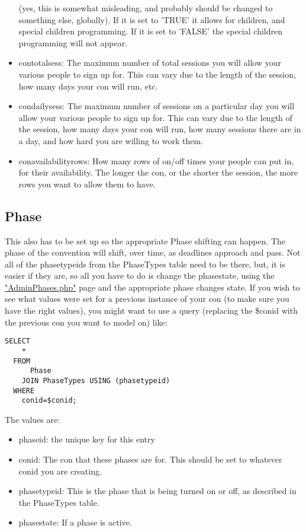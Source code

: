 \documentclass[captions=tablesignature]{scrartcl}
\begin{document}
\begin{itemize}
(yes, this is somewhat misleading, and probably should be changed
to something else, globally).  If it is set to 'TRUE' it allows
for children, and special children programming.  If it is set to
'FALSE' the special children programming will not appear.
\item contotalsess: The maximum number of total sessions you will allow
your various people to sign up for.  This can vary due to the
length of the session, how many days your con will run, etc.
\item condailysess: The maximum number of sessions on a particular day
you will allow your various people to sign up for.  This can vary
due to the length of the session, how many days your con will
run, how many sessions there are in a day, and how hard you are
willing to work them.
\item conavailabilityrows: How many rows of on/off times your people
can put in, for their availability.  The longer the con, or the
shorter the session, the more rows you want to allow them to
have.
\end{itemize}

\subsection{Phase}
\label{sec-11-2}

This also has to be set up so the appropriate Phase shifting can
happen.  The phase of the convention will shift, over time, as
deadlines approach and pass.  Not all of the phasetypeids from the
PhaseTypes table need to be there, but, it is easier if they are,
so all you have to do is change the phasestate, using the
\href{../webpages/AdminPhases.php}{"AdminPhases.php"} page and the appropriate phase changes state.  If
you wish to see what values were set for a previous instance of
your con (to make sure you have the right values), you might want
to use a query (replacing the \$conid with the previous con you want
to model on) like:
\begin{verbatim}
SELECT
    *
  FROM
      Phase
    JOIN PhaseTypes USING (phasetypeid)
  WHERE
    conid=$conid;
\end{verbatim}
The values are:
\begin{itemize}
\item phaseid: the unique key for this entry
\item conid: The con that these phases are for.  This should be set to
whatever conid you are creating.
\item phasetypeid: This is the phase that is being turned on or off, as
described in the PhaseTypes table.
\item phasestate: If a phase is active.
\end{itemize}
\end{document}
